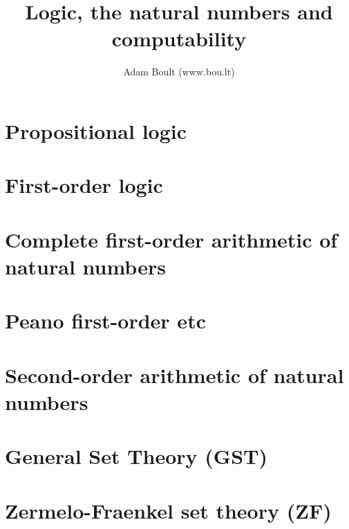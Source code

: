 \documentclass[oneside]{book}
\begin{document}
\author{Adam Boult (www.bou.lt)}
\title{Logic, the natural numbers and computability}
\maketitle

\setcounter{tocdepth}{0}
\tableofcontents



\part{Propositional logic}




\part{First-order logic}



\part{Complete first-order arithmetic of natural numbers}










\part{Peano first-order etc}








\part{Second-order arithmetic of natural numbers}



\part{General Set Theory (GST)}







\part{Zermelo-Fraenkel set theory (ZF)}


\end{document}
